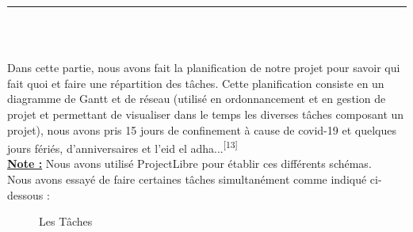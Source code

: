 \documentclass[12pt]{report}
\begin{document}
\newpage

\vspace*{-0.2in}

\begin{center}
    {\color{Blue} \rule{6.2in}{1.4mm} }\\
    \vspace{0.1in}
    \scshape{\fontsize{34}{46}{\bfseries{\color{Blue}{Planification}}}}
    \\
    \vspace{0.12in}
\end{center}
\hspace*{-0.05in}
Dans cette partie, nous avons fait la planification de notre projet pour savoir qui fait quoi et faire une répartition des tâches. Cette planification consiste en un diagramme de Gantt et de réseau (utilisé en ordonnancement et en gestion de projet et permettant de visualiser dans le temps les diverses tâches composant un projet), nous avons pris 15 jours de confinement à cause de covid-19 et quelques jours fériés, d'anniversaires et l'eid el adha...\textsuperscript{[13]}
\\
\textbf{\underline{Note :}} Nous avons utilisé ProjectLibre pour établir ces différents schémas.
\\
Nous avons essayé de faire certaines tâches simultanément comme indiqué ci-dessous :

\vspace{0.15in}

\begin{figure}[h]
\centering
\caption{Les Tâches}
\end{figure}
\end{document}
